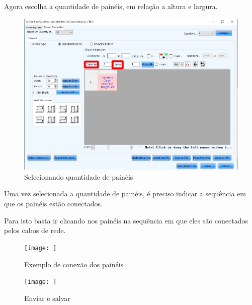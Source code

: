 \documentclass[12pt, a4paper]{article}
\begin{document}
\newpage
Agora escolha a quantidade de painéis, em relação a altura e largura.
\begin{figure}[!htb]
	\centering
	\includegraphics[width=\textwidth]{qntPaineis.jpeg}
	\caption{\label{fig:qntPaineis.jpeg}Selecionando quantidade de painéis}
\end{figure}

Uma vez selecionada a quantidade de painéis, é preciso indicar a sequência em que os painéis estão conectados.

Para isto basta ir clicando nos painéis na sequência em que eles são conectados pelos cabos de rede.

\begin{figure}[!htb]
	\centering
	\texttt{[image: ]}
	\caption{\label{fig:}Exemplo de conexão dos painéis}
\end{figure}

\begin{figure}[!htb]
	\centering
	\texttt{[image: ]}
	\caption{\label{fig:}Enviar e salvar}
\end{figure}

\cleardoublepage

\end{document}
